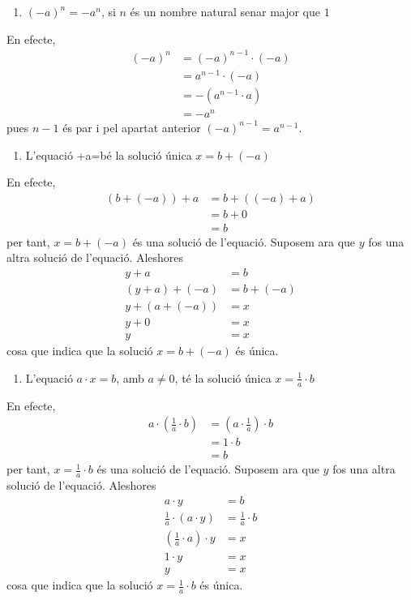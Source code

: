 \begin{enumerate}
\item[14.] $(-a)^{n}=-a^{n}$, si $n$ és un nombre natural senar major
que $1$
\end{enumerate}

En efecte,%
\begin{align*}
(-a)^{n} &=(-a)^{n-1}\cdot (-a) \\
&=a^{n-1}\cdot (-a) \\
&=-(a^{n-1}\cdot a) \\
&=-a^{n}
\end{align*}%
pues $n-1$ és par i pel apartat anterior $(-a)^{n-1}=a^{n-1}$.

\begin{enumerate}
\item[15.] L’equació +a=bé la solució única $x=b+(-a)$
\end{enumerate}

En efecte,%
\begin{align*}
\left( b+(-a)\right) +a &=b+\left( (-a)+a\right) \\
&=b+0 \\
&=b
\end{align*}%
per tant, $x=b+(-a)$ és una solució de l’equació. Suposem ara
que $y$ fos una altra solució de l’equació. Aleshores%
\begin{align*}
y+a &=b \\
\left( y+a\right) +(-a) &=b+(-a) \\
y+(a+(-a)) &=x \\
y+0 &=x \\
y &=x
\end{align*}%
cosa que indica que la solució $x=b+(-a)$ és única.

\begin{enumerate}
\item[16.] L’equació $a\cdot x=b$, amb $a\neq 0$, té la solució única $x=\frac{1}{a}\cdot b$
\end{enumerate}

En efecte,%
\begin{align*}
a\cdot \left( \frac{1}{a}\cdot b\right) &=\left( a\cdot \frac{1}{a}\right)
\cdot b \\
&=1\cdot b \\
&=b
\end{align*}%
per tant, $x=\frac{1}{a}\cdot b$ és una solució de l’equació.
Suposem ara que $y$ fos una altra solució de l’equació. Aleshores%
\begin{align*}
a\cdot y &=b \\
\frac{1}{a}\cdot \left( a\cdot y\right) &=\frac{1}{a}\cdot b \\
\left( \frac{1}{a}\cdot a\right) \cdot y &=x \\
1\cdot y &=x \\
y &=x
\end{align*}%
cosa que indica que la solució $x=\frac{1}{a}\cdot b$ és única.

